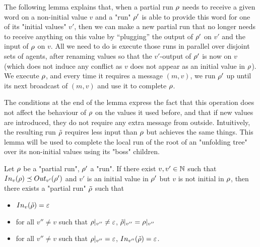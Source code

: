 The following lemma explains that, when a partial run $\rho$ needs to receive a given word on a non-initial value $v$ and a "run" $\rho'$ is able to provide this word for one of its "initial values" $v'$, then we can make a new partial run that no longer needs to receive anything on this value by ``plugging'' the output of $\rho'$ on $v'$ and the input of $\rho$ on $v$. All we need to do is execute those runs in parallel over disjoint sets of agents, after renaming values so that the $v'$-output of $\rho'$ is now on $v$ (which does not induce any conflict as $v$ does not appear as an initial value in $\rho$). We execute $\rho$, and every time it requires a message $(m,v)$, we run $\rho'$ up until its next broadcast of $(m,v)$ and use it to complete $\rho$.

The conditions at the end of the lemma express the fact that this operation does not affect the behaviour of $\rho$ on the values it used before, and that if new values are introduced, they do not require any extra message from outside. Intuitively, the resulting run $\Tilde{\rho}$ requires less input than $\rho$ but achieves the same things. This lemma will be used to complete the local run of the root of an "unfolding tree" over its non-initial values using its "boss" children. 

\begin{lemma}
	\label{lem:boss-composition}
	Let $\rho$ be a "partial run", $\rho'$ a "run".
	If there exist $v, v' \in \mathbb{N}$ such that $\vinput{v}{\run} \subword \voutput{v'}{\run'}$ and $v'$ is an initial value in $\rho'$ but $v$ is not initial in $\rho$, then there exists a "partial run" $\Tilde{\rho}$ such that 
	\begin{itemize}
		\item $\vinput{v}{\Tilde{\run}} = \varepsilon$ 
		
		\item for all $v'' \neq v$ such that ${\rho}|_{v''} \neq \varepsilon$, ${\Tilde{\rho}}|_{v''} = {\rho}|_{v''}$
		
		\item for all $v'' \neq v$ such that ${\rho}|_{v''} = \varepsilon$, $\vinput{v''}{\Tilde{\run}} = \varepsilon$.
	\end{itemize}
\end{lemma}


